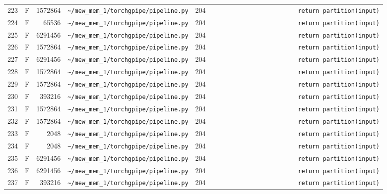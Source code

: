 \documentclass{article}
\begin{document}
\begin{longtable}{r l r p{6.5cm} r p{7.0cm}}
223 & F & 1572864 & \lstinline|~/mew_mem_1/torchgpipe/pipeline.py| & 204 & \lstinline|                        return partition(input)| \\
224 & F & 65536 & \lstinline|~/mew_mem_1/torchgpipe/pipeline.py| & 204 & \lstinline|                        return partition(input)| \\
225 & F & 6291456 & \lstinline|~/mew_mem_1/torchgpipe/pipeline.py| & 204 & \lstinline|                        return partition(input)| \\
226 & F & 1572864 & \lstinline|~/mew_mem_1/torchgpipe/pipeline.py| & 204 & \lstinline|                        return partition(input)| \\
227 & F & 6291456 & \lstinline|~/mew_mem_1/torchgpipe/pipeline.py| & 204 & \lstinline|                        return partition(input)| \\
228 & F & 1572864 & \lstinline|~/mew_mem_1/torchgpipe/pipeline.py| & 204 & \lstinline|                        return partition(input)| \\
229 & F & 1572864 & \lstinline|~/mew_mem_1/torchgpipe/pipeline.py| & 204 & \lstinline|                        return partition(input)| \\
230 & F & 393216 & \lstinline|~/mew_mem_1/torchgpipe/pipeline.py| & 204 & \lstinline|                        return partition(input)| \\
231 & F & 1572864 & \lstinline|~/mew_mem_1/torchgpipe/pipeline.py| & 204 & \lstinline|                        return partition(input)| \\
232 & F & 1572864 & \lstinline|~/mew_mem_1/torchgpipe/pipeline.py| & 204 & \lstinline|                        return partition(input)| \\
233 & F & 2048 & \lstinline|~/mew_mem_1/torchgpipe/pipeline.py| & 204 & \lstinline|                        return partition(input)| \\
234 & F & 2048 & \lstinline|~/mew_mem_1/torchgpipe/pipeline.py| & 204 & \lstinline|                        return partition(input)| \\
235 & F & 6291456 & \lstinline|~/mew_mem_1/torchgpipe/pipeline.py| & 204 & \lstinline|                        return partition(input)| \\
236 & F & 6291456 & \lstinline|~/mew_mem_1/torchgpipe/pipeline.py| & 204 & \lstinline|                        return partition(input)| \\
237 & F & 393216 & \lstinline|~/mew_mem_1/torchgpipe/pipeline.py| & 204 & \lstinline|                        return partition(input)| \\

\end{longtable}
\end{document}
